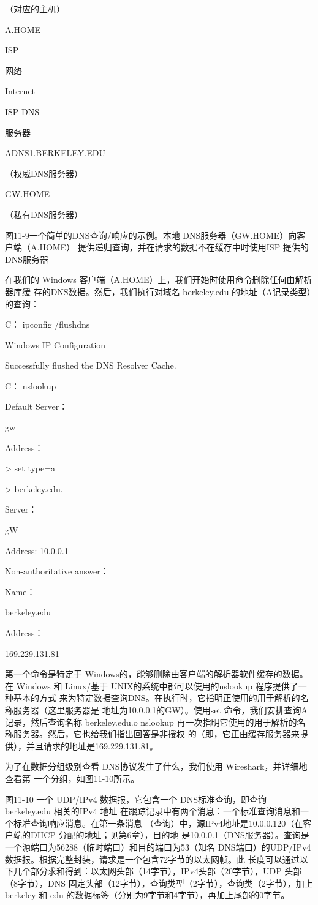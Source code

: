 （对应的主机）

A.HOME

ISP

网络

Internet

ISP DNS

服务器

ADNS1.BERKELEY.EDU

（权威DNS服务器）

GW.HOME

（私有DNS服务器）

图11-9一个简单的DNS查询/响应的示例。本地 DNS服务器（GW.HOME）向客户端（A.HOME）
提供递归查询，并在请求的数据不在缓存中时使用ISP 提供的 DNS服务器

在我们的 Windows 客户端（A.HOME）上，我们开始时使用命令删除任何由解析器库缓
存的DNS数据。然后，我们执行对域名 berkeley.edu 的地址（A记录类型）的查询：

C：\> ipconfig /flushdns

Windows IP Configuration

Successfully flushed the DNS Resolver Cache.

C：\> nslookup

Default Server：

gw

Address：

> set type=a

> berkeley.edu.

Server：

gW

Address: 10.0.0.1

Non-authoritative answer：

Name：

berkeley.edu

Address：

169.229.131.81

第一个命令是特定于 Windows的，能够删除由客户端的解析器软件缓存的数据。在
Windows 和 Linux/基于 UNIX的系统中都可以使用的nslookup 程序提供了一种基本的方式
来为特定数据查询DNS。在执行时，它指明正使用的用于解析的名称服务器（这里服务器是
地址为10.0.0.1的GW）。使用set 命令，我们安排查询A记录，然后查询名称 berkeley.edu.o
nslookup 再一次指明它使用的用于解析的名称服务器。然后，它也给我们指出回答是非授权
的（即，它正由缓存服务器来提供），并且请求的地址是169.229.131.81。

为了在数据分组级别查看 DNS协议发生了什么，我们使用 Wireshark，并详细地查看第
一个分组，如图11-10所示。

图11-10
一个 UDP/IPv4 数据报，它包含一个 DNS标准查询，即查询 berkeley.edu 相关的IPv4 地址
在跟踪记录中有两个消息：一个标准查询消息和一个标准查询响应消息。在第一条消息
（查询）中，源IPv4地址是10.0.0.120（在客户端的DHCP 分配的地址；见第6章），目的地
是10.0.0.1（DNS服务器）。查询是一个源端口为56288（临时端口）和目的端口为53（知名
DNS端口）的UDP/IPv4数据报。根据完整封装，请求是一个包含72字节的以太网帧。此
长度可以通过以下几个部分求和得到：以太网头部（14字节），IPv4头部（20字节），UDP
头部（8字节），DNS 固定头部（12字节），查询类型（2字节），查询类（2字节），加上
berkeley 和 edu 的数据标签（分别为9字节和4字节），再加上尾部的0字节。

